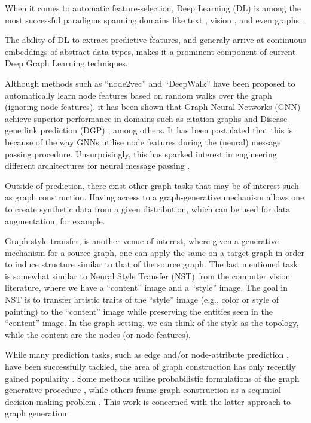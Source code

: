 \documentclass{report}
\numberwithin{equation}{section}
\numberwithin{figure}{section}
\numberwithin{table}{section}
\numberwithin{algorithm}{section}
\begin{document}
When it comes to automatic feature-selection, Deep Learning (DL)
is among the most successful paradigms spanning domains like 
text \citep{textCNN,RNNs,SentimentRNN,BERT}, 
vision \citep{alexnet}, and even graphs \citep{ScarselliGNN,VGAE,GCN,GAT}.

The ability of DL to extract predictive features, and generaly 
arrive at continuous embeddings of abstract data types, makes 
it a prominent component of current Deep Graph Learning techniques.

Although methods such as ``node2vec'' and ``DeepWalk'' 
\citep{node2vec,DeepWalk} have been 
proposed to automatically learn node features based on random 
walks over the graph (ignoring node features), 
it has been shown that Graph Neural Networks 
(GNN) \citep{ScarselliGNN,GCN} achieve superior performance in domains 
such as citation graphs \citep{VGAE} and Disease-gene link prediction 
(DGP) \citep{VGAEDisease}, among others. 
It has been postulated that this is because 
of the way GNNs utilise node features during the (neural) 
message passing procedure. Unsurprisingly, this has sparked interest 
in engineering different architectures for neural message passing 
\citep{GCN,MPNNs,GAT,GATv2}.

Outside of prediction, there exist other graph tasks that may be 
of interest such as graph construction. Having access to a 
graph-generative mechanism allows 
one to create synthetic data from a given distribution, which can 
be used for data augmentation, for example. 

Graph-style transfer, is another 
venue of interest, where given a generative mechanism for 
a source graph, one can apply the same on a target graph in order 
to induce structure similar to that of the source graph. The 
last mentioned task is somewhat similar to Neural Style Transfer (NST) 
\citep{NSTGatys} from the computer vision literature, where we 
have a ``content'' image and a ``style'' image. The goal in NST 
is to transfer artistic traits of the ``style'' image 
(e.g., color or style of painting) to the ``content'' image 
while preserving the entities seen in the ``content'' image. In 
the graph setting, we can think of the style as the topology, 
while the content are the nodes (or node features).  

While many prediction tasks, such as edge and/or node-attribute 
prediction \citep{GCN,VGAE,VGAEDisease,node2vec,DeepWalk}, 
have been successfully tackled, 
the area of graph construction has only recently gained popularity 
\citep{Darvariu,DeepMindGraphGen,GCNPolicyGraphGen,GraphRNN,GraphOpt,olivecrona2017molecular,Yang2017}.
Some methods 
utilise probabilistic formulations of the graph generative 
procedure \citep{NetGAN,DeepMindGraphGen,GraphRNN}, 
while others frame graph 
construction as a sequntial decision-making problem 
\cite{Darvariu,GraphOpt,GCNPolicyGraphGen,Yang2017,olivecrona2017molecular}. 
This work 
is concerned with the latter approach to graph generation. 
\end{document}
